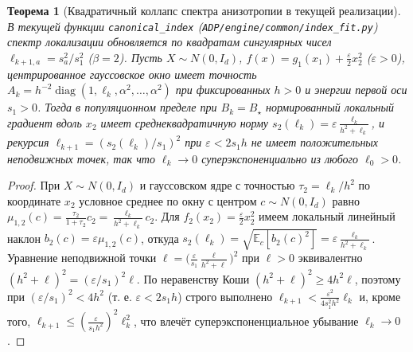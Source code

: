 \documentclass[11pt,a4paper]{article}
\numberwithin{equation}{section}
\newtheorem{theorem}{Теорема}[section]
\theoremstyle{definition}
\theoremstyle{remark}
\newcommand{\E}{\mathbb{E}}
\newcommand{\diag}{\operatorname{diag}}
\newcommand{\code}[1]{\nolinkurl{#1}}
\begin{document}
\begin{theorem}[Квадратичный коллапс спектра анизотропии в текущей реализации]
\label{thm:quad-collapse}
В текущей функции \code{canonical_index} (\code{ADP/engine/common/index_fit.py})
спектр локализации обновляется по квадратам сингулярных чисел $\ell_{k+1,a} = s_a^2 / s_1^2$ ($\beta = 2$).
Пусть $X \sim N(0, I_d)$, $f(x) = g_1(x_1) + \frac{\varepsilon}{2} x_2^2$ ($\varepsilon > 0$),
центрированное гауссовское окно имеет точность $A_k = h^{-2}\diag(1, \ell_k, \alpha^2, \dots, \alpha^2)$
при фиксированных $h > 0$ и энергии первой оси $s_1 > 0$.
Тогда в популяционном пределе при $B_k = B_\star$ нормированный локальный градиент вдоль $x_2$
имеет среднеквадратичную норму $s_2(\ell_k) = \varepsilon \frac{\ell_k}{h^2 + \ell_k}$,
и рекурсия $\ell_{k+1} = (s_2(\ell_k) / s_1)^2$ при $\varepsilon < 2 s_1 h$ не имеет положительных
неподвижных точек, так что $\ell_k \to 0$ суперэкспоненциально из любого $\ell_0 > 0$.
\end{theorem}

\begin{proof}
При $X \sim N(0, I_d)$ и гауссовском ядре с точностью $\tau_2 = \ell_k / h^2$ по координате $x_2$
условное среднее по окну с центром $c \sim N(0, I_d)$ равно $\mu_{1,2}(c) = \frac{\tau_2}{1 + \tau_2} c_2 = \frac{\ell_k}{h^2 + \ell_k} c_2$.
Для $f_2(x_2) = \frac{\varepsilon}{2} x_2^2$ имеем локальный линейный наклон
$b_{2}(c) = \varepsilon \mu_{1,2}(c)$, откуда $s_2(\ell_k) = \sqrt{\E_c[b_2(c)^2]} = \varepsilon \frac{\ell_k}{h^2 + \ell_k}$.
Уравнение неподвижной точки $\ell = \bigl(\frac{\varepsilon}{s_1}\frac{\ell}{h^2+\ell}\bigr)^2$
при $\ell > 0$ эквивалентно $(h^2 + \ell)^2 = (\varepsilon / s_1)^2 \ell$.
По неравенству Коши $(h^2 + \ell)^2 \ge 4 h^2 \ell$, поэтому при $(\varepsilon / s_1)^2 < 4 h^2$
(т. е. $\varepsilon < 2 s_1 h$) строго выполнено $\ell_{k+1} < \frac{\varepsilon^2}{4 s_1^2 h^2} \ell_k$
и, кроме того, $\ell_{k+1} \le (\frac{\varepsilon}{s_1 h^2})^2 \ell_k^2$, что влечёт суперэкспоненциальное убывание $\ell_k \to 0$.
\end{proof}
\end{document}
